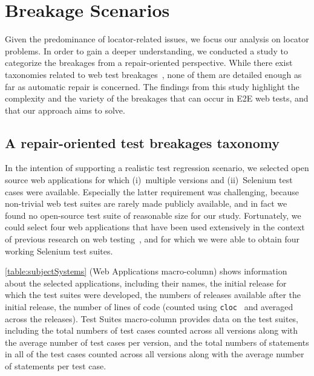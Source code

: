 
\section{Breakage Scenarios}\label{sec:study}

Given the predominance of locator-related issues, we focus our analysis on locator problems. In order to gain a deeper understanding, we conducted a study to categorize the breakages from a repair-oriented perspective. 
While there exist taxonomies related to web test breakages~\cite{Hammoudi-2016-ICST,Issa:2012:VTG:2412102.2412107,7102582}, none of them are detailed enough as far as automatic repair is concerned. 
The findings from this study highlight the complexity and the variety of the breakages that can occur in E2E web tests, and that our approach aims to solve.

\subsection{A repair-oriented test breakages taxonomy}\label{sec:taxonomy}

\label{sec:study}
In the intention of supporting a realistic test regression scenario, we selected open source web applications for which (i)~multiple versions and (ii)~Selenium test cases were available. Especially the latter requirement was challenging, because non-trivial web test suites are rarely made publicly available, and in fact we found no open-source test suite of reasonable size for our study. Fortunately, we could select four web applications that have been used extensively in the context of previous research on web testing~\cite{WCRE}, and for which we were able to obtain four working Selenium test suites.

\autoref{table:subjectSystems} (Web Applications macro-column) shows information about the selected applications, including their names, the initial release for which the test suites were developed, the numbers of releases available after the initial release, the number of lines of code (counted using \texttt{cloc}~\cite{cloc} and averaged across the releases).
Test Suites macro-column provides data on the test suites, including the total numbers of test cases counted across all versions along with the average number of test cases per version, and the total numbers of statements in all of the test cases counted across all versions along with the average number of statements per test case.

